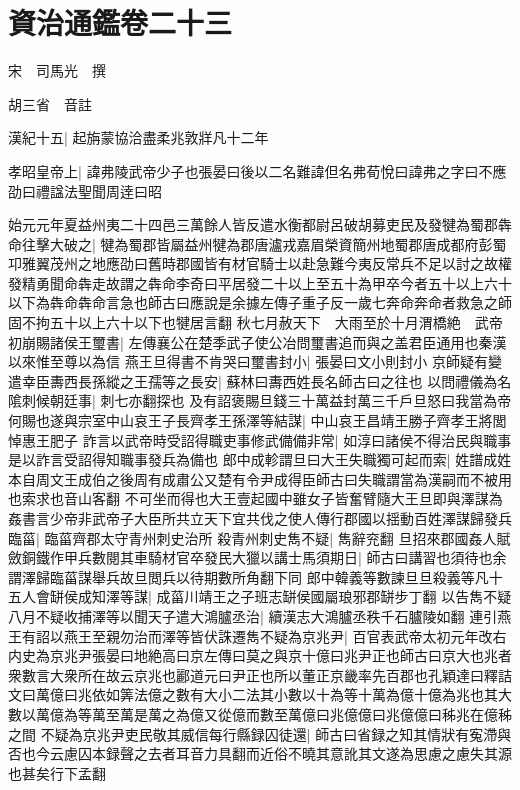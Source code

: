 \chapter{資治通鑑卷二十三}
宋　司馬光　撰

胡三省　音註

漢紀十五|{
	起旃蒙協洽盡柔兆敦牂凡十二年}


孝昭皇帝上|{
	諱弗陵武帝少子也張晏曰後以二名難諱但名弗荀悅曰諱弗之字曰不應劭曰禮諡法聖聞周逹曰昭}


始元元年夏益州夷二十四邑三萬餘人皆反遣水衡都尉呂破胡募吏民及發犍為蜀郡犇命往擊大破之|{
	犍為蜀郡皆屬益州犍為郡唐瀘戎嘉眉榮資簡州地蜀郡唐成都府彭蜀卭雅翼茂州之地應劭曰舊時郡國皆有材官騎士以赴急難今夷反常兵不足以討之故權發精勇聞命犇走故謂之犇命李奇曰平居發二十以上至五十為甲卒今者五十以上六十以下為犇命犇命言急也師古曰應說是余據左傳子重子反一歲七奔命奔命者救急之師固不拘五十以上六十以下也犍居言翻}
秋七月赦天下　大雨至於十月渭橋絶　武帝初崩賜諸侯王璽書|{
	左傳襄公在楚季武子使公冶問璽書追而與之盖君臣通用也秦漢以來惟至尊以為信}
燕王旦得書不肯哭曰璽書封小|{
	張晏曰文小則封小}
京師疑有變遣幸臣夀西長孫縱之王孺等之長安|{
	蘇林曰夀西姓長名師古曰之往也}
以問禮儀為名隂刺候朝廷事|{
	刺七亦翻探也}
及有詔褒賜旦錢三十萬益封萬三千戶旦怒曰我當為帝何賜也遂與宗室中山哀王子長齊孝王孫澤等結謀|{
	中山哀王昌靖王勝子齊孝王將閭悼惠王肥子}
詐言以武帝時受詔得職吏事修武備備非常|{
	如淳曰諸侯不得治民與職事是以詐言受詔得知職事發兵為備也}
郎中成軫謂旦曰大王失職獨可起而索|{
	姓譜成姓本自周文王成伯之後周有成肅公又楚有令尹成得臣師古曰失職謂當為漢嗣而不被用也索求也音山客翻}
不可坐而得也大王壹起國中雖女子皆奮臂隨大王旦即與澤謀為姦書言少帝非武帝子大臣所共立天下宜共伐之使人傳行郡國以揺動百姓澤謀歸發兵臨菑|{
	臨菑齊郡太守青州刺史治所}
殺青州刺史雋不疑|{
	雋辭兖翻}
旦招來郡國姦人賦斂銅鐵作甲兵數閱其車騎材官卒發民大獵以講士馬須期日|{
	師古曰講習也須待也余謂澤歸臨菑謀舉兵故旦閲兵以待期數所角翻下同}
郎中韓義等數諫旦旦殺義等凡十五人會缾侯成知澤等謀|{
	成菑川靖王之子班志缾侯國屬琅邪郡缾步丁翻}
以告雋不疑八月不疑收捕澤等以聞天子遣大鴻臚丞治|{
	續漢志大鴻臚丞秩千石臚陵如翻}
連引燕王有詔以燕王至親勿治而澤等皆伏誅遷雋不疑為京兆尹|{
	百官表武帝太初元年改右内史為京兆尹張晏曰地絶高曰京左傳曰莫之與京十億曰兆尹正也師古曰京大也兆者衆數言大衆所在故云京兆也酈道元曰尹正也所以董正京畿率先百郡也孔穎達曰釋詰文曰萬億曰兆依如筭法億之數有大小二法其小數以十為等十萬為億十億為兆也其大數以萬億為等萬至萬是萬之為億又從億而數至萬億曰兆億億曰兆億億曰秭兆在億秭之間}
不疑為京兆尹吏民敬其威信每行縣録囚徒還|{
	師古曰省録之知其情狀有寃滯與否也今云慮囚本録聲之去者耳音力具翻而近俗不曉其意訛其文遂為思慮之慮失其源也甚矣行下孟翻}
